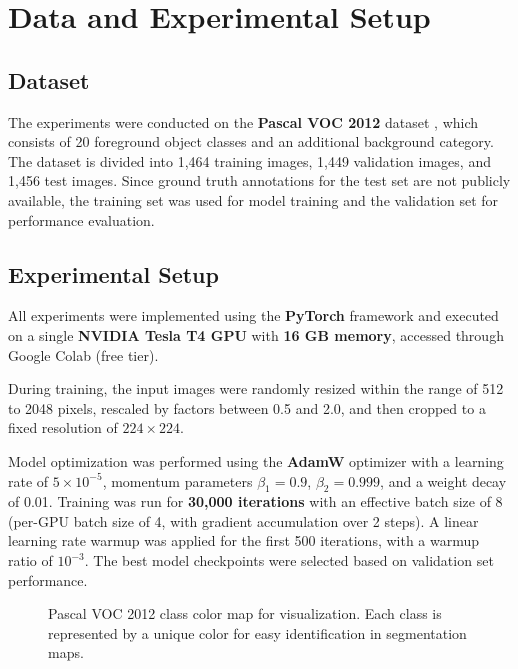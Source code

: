 \section{Data and Experimental Setup}
\label{sec:data_and_experimental_setup}

\subsection{Dataset}
\label{subsec:dataset}
The experiments were conducted on the \textbf{Pascal VOC 2012} dataset \cite{dataset_pascal_voc}, which consists of 20 foreground object classes and an additional background category. The dataset is divided into 1,464 training images, 1,449 validation images, and 1,456 test images. Since ground truth annotations for the test set are not publicly available, the training set was used for model training and the validation set for performance evaluation.

\subsection{Experimental Setup}
\label{subsec:experimental_setup}
All experiments were implemented using the \textbf{PyTorch} framework and executed on a single \textbf{NVIDIA Tesla T4 GPU} with \textbf{16 GB memory}, accessed through Google Colab (free tier).

During training, the input images were randomly resized within the range of 512 to 2048 pixels, rescaled by factors between 0.5 and 2.0, and then cropped to a fixed resolution of $224 \times 224$.

Model optimization was performed using the \textbf{AdamW} optimizer with a learning rate of $5 \times 10^{-5}$, momentum parameters $\beta_1 = 0.9$, $\beta_2 = 0.999$, and a weight decay of 0.01. Training was run for \textbf{30,000 iterations} with an effective batch size of 8 (per-GPU batch size of 4, with gradient accumulation over 2 steps). A linear learning rate warmup was applied for the first 500 iterations, with a warmup ratio of $10^{-3}$. The best model checkpoints were selected based on validation set performance.

\begin{figure}[t]
    \centering
    \caption{Pascal VOC 2012 class color map for visualization. Each class is represented by a unique color for easy identification in segmentation maps.}
    \label{fig:class_colors_voc2012}
\end{figure}

